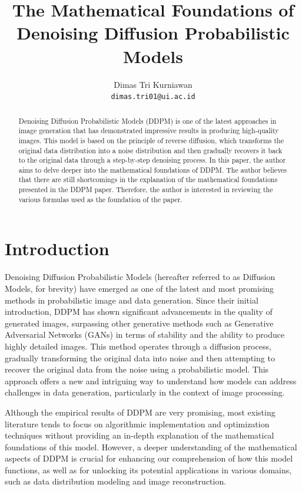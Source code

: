 \documentclass{article}
\title{The Mathematical Foundations of Denoising Diffusion Probabilistic Models}
\author{
	Dimas Tri Kurniawan\\
	\texttt{dimas.tri01@ui.ac.id}
}
\begin{document}
\maketitle


\begin{abstract}
Denoising Diffusion Probabilistic Models (DDPM) is one of the latest approaches in image generation that has demonstrated impressive results in producing high-quality images. This model is based on the principle of reverse diffusion, which transforms the original data distribution into a noise distribution and then gradually recovers it back to the original data through a step-by-step denoising process. In this paper, the author aims to delve deeper into the mathematical foundations of DDPM. The author believes that there are still shortcomings in the explanation of the mathematical foundations presented in the DDPM paper. Therefore, the author is interested in reviewing the various formulas used as the foundation of the paper.
\end{abstract}


\section{Introduction}


Denoising Diffusion Probabilistic Models (hereafter referred to as Diffusion Models, for brevity) have emerged as one of the latest and most promising methods in probabilistic image and data generation. Since their initial introduction, DDPM has shown significant advancements in the quality of generated images, surpassing other generative methods such as Generative Adversarial Networks (GANs) in terms of stability and the ability to produce highly detailed images. This method operates through a diffusion process, gradually transforming the original data into noise and then attempting to recover the original data from the noise using a probabilistic model. This approach offers a new and intriguing way to understand how models can address challenges in data generation, particularly in the context of image processing.

Although the empirical results of DDPM are very promising, most existing literature tends to focus on algorithmic implementation and optimization techniques without providing an in-depth explanation of the mathematical foundations of this model. However, a deeper understanding of the mathematical aspects of DDPM is crucial for enhancing our comprehension of how this model functions, as well as for unlocking its potential applications in various domains, such as data distribution modeling and image reconstruction.
\end{document}
